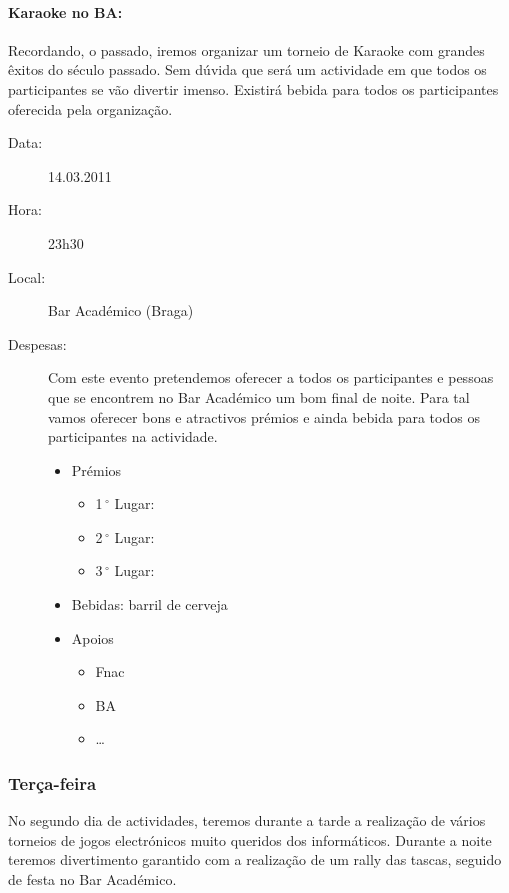 \paragraph{Karaoke no BA:}
Recordando, o passado, iremos organizar um torneio de Karaoke com grandes êxitos do século passado. Sem dúvida que será um actividade em que todos os participantes se vão divertir imenso. Existirá bebida para todos os participantes oferecida pela organização.
\begin{description}
\item[Data:] 14.03.2011
\item[Hora:] 23h30
\item[Local:] Bar Académico (Braga)
\item[Despesas:] Com este evento pretendemos oferecer a todos os participantes e pessoas que se encontrem no Bar Académico um bom final de noite. Para tal vamos oferecer bons e atractivos prémios e ainda bebida para todos os participantes na actividade.
\begin{itemize}
\item Prémios
\begin{itemize}
\item 1$\,^{\circ}$ Lugar:
\item 2$\,^{\circ}$ Lugar:
\item 3$\,^{\circ}$ Lugar:
\end{itemize}
\item Bebidas: barril de cerveja
\item Apoios
\begin{itemize}
\item Fnac
\item BA
\item \dots  
\end{itemize}
\end{itemize}
\end{description}
\subsubsection*{Terça-feira}
No segundo dia de actividades, teremos durante a tarde a realização de vários torneios de jogos electrónicos muito queridos dos informáticos. Durante a noite teremos divertimento garantido com a realização de um rally das tascas, seguido de festa no Bar Académico.
%
